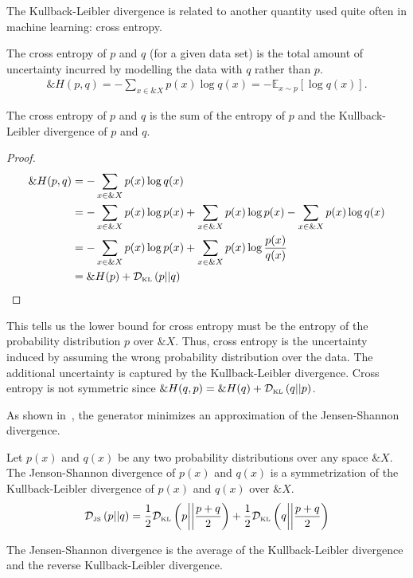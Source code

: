 The Kullback-Leibler divergence is related to another quantity used quite often
in machine learning: cross entropy.
\begin{definition}
  The \textnormal{\sffamily cross entropy} of $p$ and $q$ (for a given data set) is the total
  amount of uncertainty incurred by modelling the data with $q$ rather than $p$.
  \begin{align}
    \&H(p, q) = - \sum_{x \in \&X} p(x) \log q(x) = -\mathbb{E}_{x \sim p}\left[\log{q(x)}\right].
  \end{align}
\end{definition}

\begin{lemma}
  The cross entropy of $p$ and $q$ is the sum of the entropy of $p$ and the
  Kullback-Leibler divergence of $p$ and $q$.
\end{lemma}
\begin{proof}
\begin{align}
  \label{eq:cross-entropy-alt}
  \&H(p, q) & = -\sum_{x \in \&X} p(x) \log q(x) \\
            & = -\sum_{x \in \&X} p(x) \log p(x) + \sum_{x \in \&X} p(x) \log p(x) - \sum_{x \in \&X} p(x) \log q(x) \\
            & = -\sum_{x \in \&X} p(x) \log p(x) + \sum_{x \in \&X} p(x) \log {p(x) \over q(x)} \\
            & = \&H(p) + \mathcal{D}_{\text{\tiny KL}}\left( p \middle| \middle| q \right)
\end{align}
\end{proof}

This tells us the lower bound for cross entropy must be the entropy of the
probability distribution $p$ over $\&X$. Thus, cross entropy is the uncertainty
induced by assuming the wrong probability distribution over the data. The
additional uncertainty is captured by the Kullback-Leibler divergence. Cross
entropy is not symmetric since $\&H(q, p) = \&H(q) + \mathcal{D}_{\text{\tiny KL}}\left( q \middle| \middle| p \right)$.

As shown in~\cite{ref:goodfellow-original}, the generator minimizes an
approximation of the Jensen-Shannon divergence.

\begin{definition}%
  \label{def:jsd}
  Let $p(x)$ and $q(x)$ be any two probability distributions over any
  space $\&X$. The \textnormal{\sffamily Jenson-Shannon divergence} of
  $p(x)$ and $q(x)$ is a symmetrization of the Kullback-Leibler
  divergence of $p(x)$ and $q(x)$ over $\&X$.
  \begin{align}
    \mathcal{D}_{\text{\tiny JS}}\left(p\middle|\middle|q\right) = {1 \over 2} \mathcal{D}_{\text{\tiny KL}}\left( p \middle| \middle| p + q \over 2 \right) + {1 \over 2} \mathcal{D}_{\text{\tiny KL}}\left( q \middle| \middle| p + q
    \over 2 \right)
  \end{align}
\end{definition}
\begin{remark}
  The Jensen-Shannon divergence is the average of the Kullback-Leibler
  divergence and the reverse Kullback-Leibler divergence.
\end{remark}

